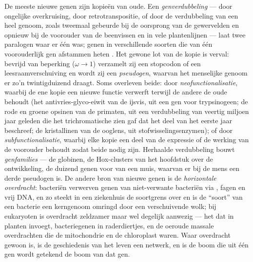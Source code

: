 \begin{definition}\label{def:b3:molecular-evolution:duplication}
De meeste nieuwe genen zijn kopieën van oude. Een
\emph{genverdubbeling} --- door ongelijke overkruising, door
retrotranspositie, of door de verdubbeling van een heel genoom, zoals
tweemaal gebeurde bij de oorsprong van de gewervelden en opnieuw bij de
voorouder van de beenvissen en in vele plantenlijnen --- laat twee
paralogen waar er één was; genen in verschillende soorten die
van één voorouderlijk gen afstammen heten . Het gewone
lot van de kopie is verval: bevrijd van beperking ($\omega \to 1$)
verzamelt zij een stopcodon of een leesraamverschuiving en wordt zij
een \emph{pseudogen}, waarvan het menselijke genoom er zo'n
twintigduizend draagt. Soms overleven beide: door
\emph{neofunctionalisatie}, waarbij de ene kopie een nieuwe functie
verwerft terwijl de andere de oude behoudt (het antivries-glyco-eiwit
van de ijsvis, uit een gen voor trypsinogeen; de rode en groene
opsinen van de primaten, uit een verdubbeling van veertig miljoen jaar
geleden die het trichromatische zien gaf dat het deel van het eerste
jaar beschreef; de kristallinen van de ooglens, uit
stofwisselingsenzymen); of door \emph{subfunctionalisatie}, waarbij
elke kopie een deel van de expressie of de werking van de voorouder
behoudt zodat beide nodig zijn. Herhaalde verdubbeling bouwt
\emph{genfamilies} --- de globinen, de Hox-clusters van het hoofdstuk
over de ontwikkeling, de duizend genen voor  van een
muis, waarvan er bij de mens een derde pseudogen is. De andere bron van
nieuwe genen is de \emph{horizontale overdracht}: bacteriën verwerven
genen van niet-verwante bacteriën via , fagen en vrij DNA, en
zo steekt  in een ziekenhuis de soortgrens
over en is de ``soort'' van een bacterie een kerngenoom omringd door
een verschuivende wolk; bij eukaryoten is overdracht zeldzamer maar wel
degelijk aanwezig --- het  dat \emph{} in planten
invoegt, bacteriegenen in raderdiertjes, en de oeroude massale
overdrachten die de mitochondrie en de chloroplast waren. Waar
overdracht gewoon is, is de geschiedenis van het leven een netwerk, en
is de boom die uit één gen wordt getekend de boom van dat gen.
\end{definition}

